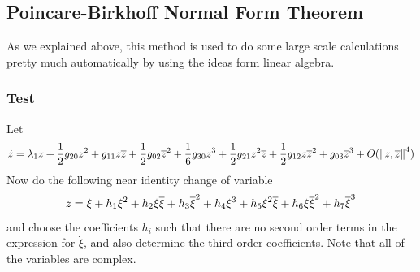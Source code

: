 \subsection{Poincare-Birkhoff Normal Form Theorem}
As we explained above, this method is used to do some large scale calculations pretty much automatically by using the ideas form linear algebra. 


\subsubsection{Test}
Let
\[ \dot{z} = \lambda_1 z + \frac{1}{2}g_{20}z^2 + g_{11}z\overline{z} + \frac{1}{2}g_{02}\overline{z}^2 + \frac{1}{6}g_{30}z^3 + \frac{1}{2}g_{21}z^2\overline{z} + \frac{1}{2}g_{12}z\overline{z}^2 + g_{03}\overline{z}^3 + O(\norm{z,\overline{z}}^4) \]
Now do the following near identity change of variable
\[ z = \xi + h_1 \xi^2 + h_2\xi\overline{\xi}+h_3\overline{\xi}^2 + h_4 \xi^3 + h_5\xi^2\overline{\xi} + h_6\xi\overline{\xi}^2 + h_7\overline{\xi}^3  \]
and choose the coefficients $h_i$ such that there are no second order terms in the expression for $\dot{\xi}$, and also determine the third order coefficients. Note that all of the variables are complex.



